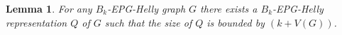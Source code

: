 \documentclass[a4paper,11pt]{article}
\newtheorem{theorem}{Theorem}
\newtheorem{lema}[theorem]{Lemma}
\begin{document}



\begin{lema}
For any $B_k$-EPG-Helly graph $G$ there exists  a $B_k$-EPG-Helly representation $Q$ of $G$ such that the size of $Q$ is bounded by $(k+V(G))$.

\end{lema}
\end{document}
